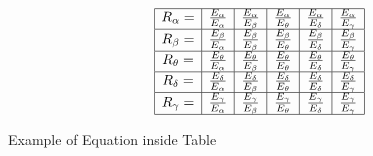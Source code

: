     \begin{table}[ht]
      \centering
      \renewcommand{\arraystretch}{2}
      $$
      \begin{array}{|c|c|c|c|c|c|c|}
        \hline
        R_{\alpha} = & \frac{E_{\alpha}}{E_\alpha} & \frac{E_{\alpha}}{E_\beta} & \frac{E_{\alpha}}{E_\theta} & \frac{E_{\alpha}}{E_\delta} & \frac{E_{\alpha}}{E_\gamma} \\ \hline
        R_{\beta} =  & \frac{E_{\beta}}{E_\alpha}  & \frac{E_{\beta}}{E_\beta}  & \frac{E_{\beta}}{E_\theta}  & \frac{E_{\beta}}{E_\delta}  & \frac{E_{\beta}}{E_\gamma}  \\ \hline
        R_{\theta} = & \frac{E_{\theta}}{E_\alpha} & \frac{E_{\theta}}{E_\beta} & \frac{E_{\theta}}{E_\theta} & \frac{E_{\theta}}{E_\delta} & \frac{E_{\theta}}{E_\gamma} \\ \hline
        R_{\delta} = & \frac{E_{\delta}}{E_\alpha} & \frac{E_{\delta}}{E_\beta} & \frac{E_{\delta}}{E_\theta} & \frac{E_{\delta}}{E_\delta} & \frac{E_{\delta}}{E_\gamma} \\ \hline
        R_{\gamma} = & \frac{E_{\gamma}}{E_\alpha} & \frac{E_{\gamma}}{E_\beta} & \frac{E_{\gamma}}{E_\theta} & \frac{E_{\gamma}}{E_\delta} & \frac{E_{\gamma}}{E_\gamma} \\   \hline    
      \end{array}
    $$
    \caption{Example of Equation inside Table}
  \end{table}
